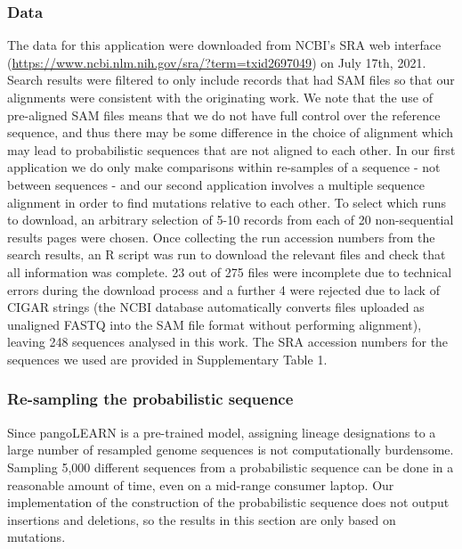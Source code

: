 \documentclass[12pt]{article}
\begin{document}
\subsubsection{Data}

The data for this application were downloaded from NCBI's SRA web interface (\url{https://www.ncbi.nlm.nih.gov/sra/?term=txid2697049}) on July 17th, 2021.
Search results were filtered to only include records that had SAM files so that our alignments were consistent with the originating work.
We note that the use of pre-aligned SAM files means that we do not have full control over the reference sequence, and thus there may be some difference in the choice of alignment which may lead to probabilistic sequences that are not aligned to each other.
In our first application we do only make comparisons within re-samples of a sequence - not between sequences - and our second application involves a multiple sequence alignment in order to find mutations relative to each other.
To select which runs to download, an arbitrary selection of 5-10 records from each of 20 non-sequential results pages were chosen.
Once collecting the run accession numbers from the search results, an R script was run to download the relevant files and check that all information was complete.
23 out of 275 files were incomplete due to technical errors during the download process and a further 4 were rejected due to lack of CIGAR strings (the NCBI database automatically converts files uploaded as unaligned FASTQ into the SAM file format without performing alignment), leaving 248 sequences analysed in this work. 
The SRA accession numbers for the sequences we used are provided in Supplementary Table 1. 



\subsubsection{Re-sampling the probabilistic sequence}\label{sec:Res1}


Since pangoLEARN is a pre-trained model, assigning lineage designations to a large number of resampled genome sequences is not computationally burdensome.
Sampling 5,000 different sequences from a probabilistic sequence can be done in a reasonable amount of time, even on a mid-range consumer laptop.
Our implementation of the construction of the probabilistic sequence does not output insertions and deletions, so the results in this section are only based on mutations.
\end{document}
